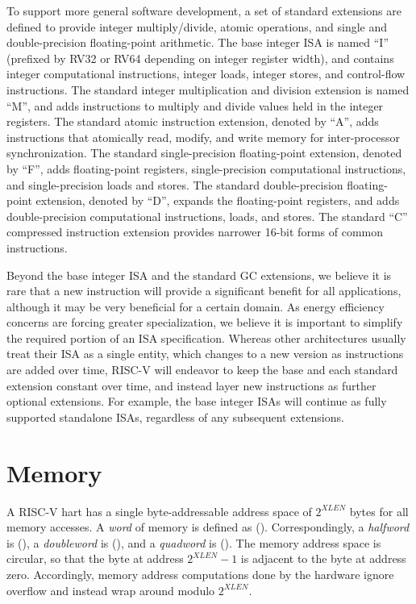 To support more general software development, a set of standard
extensions are defined to provide integer multiply/divide, atomic
operations, and single and double-precision floating-point arithmetic.
The base integer ISA is named ``I'' (prefixed by RV32 or RV64
depending on integer register width), and contains integer
computational instructions, integer loads, integer stores, and
control-flow instructions.  The standard integer multiplication and
division extension is named ``M'', and adds instructions to multiply
and divide values held in the integer registers.  The standard atomic
instruction extension, denoted by ``A'', adds instructions that
atomically read, modify, and write memory for inter-processor
synchronization.  The standard single-precision floating-point
extension, denoted by ``F'', adds floating-point registers,
single-precision computational instructions, and single-precision
loads and stores.  The standard double-precision floating-point
extension, denoted by ``D'', expands the floating-point registers, and
adds double-precision computational instructions, loads, and stores.
The standard ``C'' compressed instruction extension
provides narrower 16-bit forms of common instructions.

Beyond the base integer ISA and the standard GC extensions, we believe
it is rare that a new instruction will provide a significant benefit
for all applications, although it may be very beneficial for a certain
domain.  As energy efficiency concerns are forcing greater
specialization, we believe it is important to simplify the required
portion of an ISA specification.  Whereas other architectures usually
treat their ISA as a single entity, which changes to a new version as
instructions are added over time, RISC-V will endeavor to keep the
base and each standard extension constant over time, and instead layer
new instructions as further optional extensions.  For example, the
base integer ISAs will continue as fully supported standalone ISAs,
regardless of any subsequent extensions.

\section{Memory}

A RISC-V hart has a single byte-addressable address space
of $2^{XLEN}$ bytes for all memory
accesses.  A {\em word} of memory is defined as 
().  Correspondingly, a {\em halfword} is 
(), a {\em doubleword} is 
(), and a {\em quadword} is 
().
The memory address space is circular, so that the byte at address
$2^{XLEN}-1$ is adjacent to the byte at address zero.  Accordingly, memory
address computations done by the hardware ignore overflow and instead
wrap around modulo $2^{XLEN}$.


